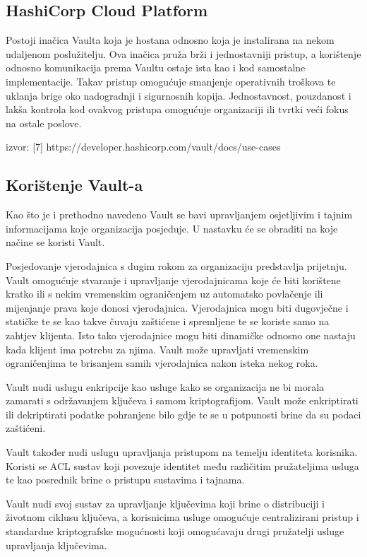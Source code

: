 \documentclass[]{foi}
\begin{document}
\subsection{HashiCorp Cloud Platform}

Postoji inačica Vaulta koja je hostana odnosno koja je instalirana na nekom udaljenom poslužitelju.
Ova inačica pruža brži i jednostavniji pristup, a korištenje odnosno komunikacija prema Vaultu ostaje ista kao i kod samostalne implementacije.
Takav pristup omogućuje smanjenje operativnih troškova te uklanja brige oko nadogradnji i sigurnosnih kopija.
Jednostavnost, pouzdanost i lakša kontrola kod ovakvog pristupa omogućuje organizaciji ili tvrtki veći fokus na ostale poslove.

\cite{hashicorp-vault-use-cases}
izvor: [7] https://developer.hashicorp.com/vault/docs/use-cases

\subsection{Korištenje Vault-a}

Kao što je i prethodno navedeno Vault se bavi upravljanjem osjetljivim i tajnim informacijama koje organizacija posjeduje.
U nastavku će se obraditi na koje načine se koristi Vault.

Posjedovanje vjerodajnica s dugim rokom za organizaciju predstavlja prijetnju.
Vault omogućuje stvaranje i upravljanje vjerodajnicama koje će biti korištene kratko ili s nekim vremenskim ograničenjem uz automatsko povlačenje ili mijenjanje prava koje donosi vjerodajnica.
Vjerodajnica mogu biti dugovječne i statičke te se kao takve čuvaju zaštićene i spremljene te se koriste samo na zahtjev klijenta.
Isto tako vjerodajnice mogu biti dinamičke odnosno one nastaju kada klijent ima potrebu za njima.
Vault može upravljati vremenskim ograničenjima te brisanjem samih vjerodajnica nakon isteka nekog roka.

Vault nudi uslugu enkripcije kao usluge kako se organizacija ne bi morala zamarati s održavanjem ključeva i samom kriptografijom.
Vault može enkriptirati ili dekriptirati podatke pohranjene bilo gdje te se u potpunosti brine da su podaci zaštićeni.

Vault također nudi uslugu upravljanja pristupom na temelju identiteta korisnika.
Koristi se ACL sustav koji povezuje identitet među različitim pružateljima usluga te kao posrednik brine o pristupu sustavima i tajnama.

Vault nudi svoj sustav za upravljanje ključevima koji brine o distribuciji i životnom ciklusu ključeva, a korisnicima usluge omogućuje centralizirani pristup i standardne kriptografske mogućnosti koji omogućavaju drugi pružatelji usluge upravljanja ključevima.
\end{document}
